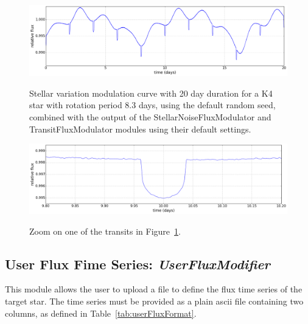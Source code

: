 \documentclass[11pt]{article}      %
\def\HCode#1{}
\def\htmlanchor#1{\HCode{<a id="#1"></a>}}
\begin{document}
\begin{figure}[hbtp]
  \begin{center}
    {\includegraphics[width=\textwidth]{stellar_variation2.png}}
    \caption{Stellar variation modulation curve with 20 day duration for a K4 star with rotation period 8.3 days, using the default random seed, combined with the output of the StellarNoiseFluxModulator and TransitFluxModulator modules using their default settings.}
    \label{fig:variation2}
  \end{center}
\end{figure}

\begin{figure}[hbtp]
  \begin{center}
    {\includegraphics[width=\textwidth]{stellar_variation3.png}}
    \caption{Zoom on one of the transits in Figure~\ref{fig:variation2}.}
    \label{fig:variation3}
  \end{center}
\end{figure}

\clearpage 
\htmlanchor{UserFluxModifier}
\subsection{User Flux Fime Series:  {\it UserFluxModifier}}
\label{sec:UserFluxModifier}

This module allows the user to upload a file to define the flux time series of the target star. The time series must be provided as a plain ascii file containing two columns, as defined in Table~\ref{tab:userFluxFormat}.
\end{document}
